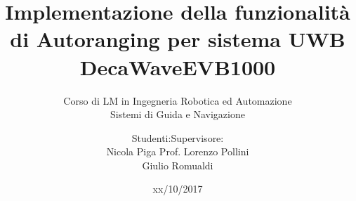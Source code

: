 \documentclass{beamer}
\date{xx/10/2017}
\title[]{Implementazione della funzionalità di Autoranging per sistema UWB DecaWaveEVB1000}
\subtitle{Corso di LM in Ingegneria Robotica ed Automazione \\
  Sistemi di Guida e Navigazione}
\author{Studenti:\hfill Supervisore:\\
Nicola Piga \hfill Prof. Lorenzo Pollini\\
Giulio Romualdi}
\institute[]{Università di Pisa}
\begin{document}

\begin{frame}
  \maketitle
\end{frame}















\end{document}

